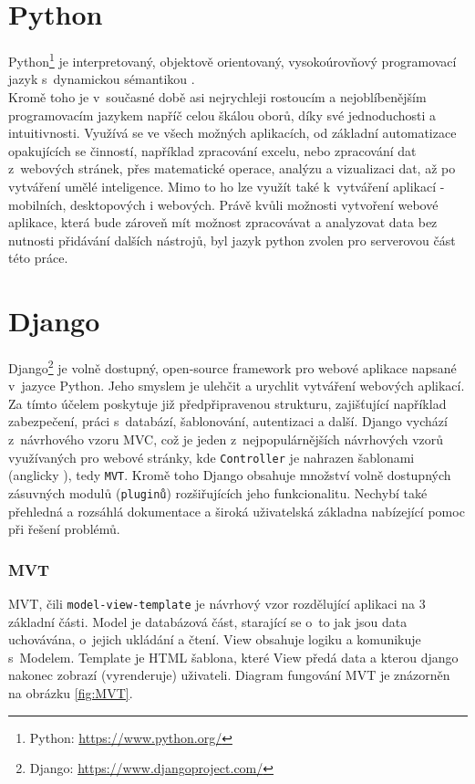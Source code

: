 \section{Python}
Python\footnote{Python: \url{https://www.python.org/}} je interpretovaný, objektově orientovaný, vysokoúrovňový programovací jazyk s~dynamickou sémantikou \cite{PYTHON}. \\
Kromě toho je v~současné době asi nejrychleji rostoucím a nejoblíbenějším programovacím jazykem napříč celou škálou oborů, díky své jednoduchosti a intuitivnosti. Využívá se ve všech možných aplikacích, od základní automatizace opakujících se činností, například zpracování excelu, nebo zpracování dat z~webových stránek, přes matematické operace, analýzu a vizualizaci dat, až po vytváření umělé inteligence. Mimo to ho lze využít také k~vytváření aplikací - mobilních, desktopových i webových. Právě kvůli možnosti vytvoření webové aplikace, která bude zároveň mít možnost zpracovávat a analyzovat data bez nutnosti přidávání dalších nástrojů, byl jazyk python zvolen pro serverovou část této práce.

\section{Django}
Django\footnote{Django: \url{https://www.djangoproject.com/}} je volně dostupný, open-source framework pro webové aplikace napsané v~jazyce Python. Jeho smyslem je ulehčit a urychlit vytváření webových aplikací. Za tímto účelem poskytuje již předpřipravenou strukturu, zajišťující například zabezpečení, práci s~databází, šablonování, autentizaci a další. Django vychází z~návrhového vzoru MVC, což je jeden z~nejpopulárnějších návrhových vzorů využívaných pro webové stránky, kde \texttt{Controller} je nahrazen šablonami (anglicky ), tedy \texttt{MVT}. Kromě toho Django obsahuje množství volně dostupných zásuvných modulů (\texttt{pluginů}) rozšiřujících jeho funkcionalitu. Nechybí také přehledná a rozsáhlá dokumentace a široká uživatelská základna nabízející pomoc při řešení problémů.

\subsubsection{MVT}
MVT, čili \texttt{model-view-template} je návrhový vzor rozdělující aplikaci na 3 základní části. Model je databázová část, starající se o~to jak jsou data uchovávána, o~jejich ukládání a čtení. View obsahuje logiku a komunikuje s~Modelem. Template je HTML šablona, které View předá data a kterou django nakonec zobrazí (vyrenderuje) uživateli. Diagram fungování MVT je znázorněn na obrázku \ref{fig:MVT}.

